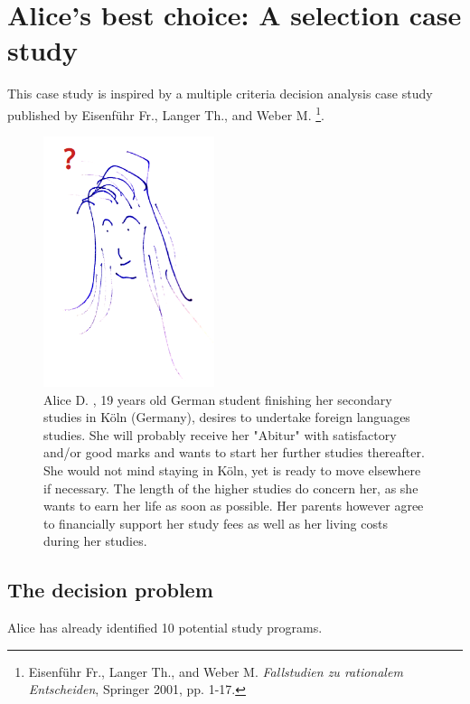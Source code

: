 \chapter{Alice's best choice: A selection case study}
\label{sec:12}



This case study is inspired by a multiple criteria decision analysis case study published by Eisenführ Fr., Langer Th., and Weber M. \footnote{Eisenführ Fr., Langer Th., and Weber M. \emph{Fallstudien zu rationalem Entscheiden}, Springer 2001, pp. 1-17.}.

\begin{figure}[h]
\sidecaption
\includegraphics[width=5cm]{Figures/AliceF.png}
\caption{Alice D. , 19 years old German student finishing her secondary studies in Köln (Germany), desires to undertake foreign languages studies. She will probably receive her "Abitur" with satisfactory and/or good marks and  wants to start her further studies thereafter. She would not mind staying in Köln, yet is ready to move elsewhere if necessary. The length of the higher studies do concern her, as she wants to earn her life as soon as possible.  Her parents however agree to financially support her study fees as well as her living costs during her studies.}
\label{fig:12.1}       %
\end{figure}

\section{The decision problem}
\label{sec:12.1}

Alice has already identified 10 potential study programs.

